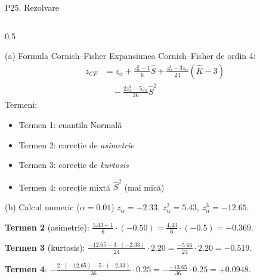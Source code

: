 \documentclass[9pt, aspectratio=169, t]{beamer}
\begin{document}
\begin{frame}[shrink=40]{P25. Rezolvare}
\begin{columns}[T]
\begin{column}{0.5\textwidth}
\begin{block}{(a) Formula Cornish--Fisher}
Expansiunea Cornish--Fisher de ordin 4:
\begin{align*}
z_{CF} &= z_\alpha + \frac{z_\alpha^2 - 1}{6}\hat S + \frac{z_\alpha^3 - 3z_\alpha}{24}(\hat K - 3) \\
&\quad - \frac{2z_\alpha^3 - 5z_\alpha}{36}\hat S^2
\end{align*}
Termeni:
\begin{itemize}\setlength{\itemsep}{0pt}
    \item Termen 1: cuantila Normală
    \item Termen 2: corecție de \emph{asimetrie}
    \item Termen 3: corecție de \emph{kurtosis}
    \item Termen 4: corecție mixtă $\hat S^2$ (mai mică)
\end{itemize}
\end{block}
\begin{block}{(b) Calcul numeric ($\alpha=0.01$)}
$z_\alpha = -2.33$, $z_\alpha^2 = 5.43$, $z_\alpha^3 = -12.65$.

\textbf{Termen 2} (asimetrie): $\frac{5.43-1}{6}\cdot(-0.50) = \frac{4.43}{6}\cdot(-0.5) = -0.369$.

\textbf{Termen 3} (kurtosis): $\frac{-12.65-3\cdot(-2.33)}{24}\cdot 2.20 = \frac{-5.66}{24}\cdot 2.20 = -0.519$.

\textbf{Termen 4}: $-\frac{2\cdot(-12.65)-5\cdot(-2.33)}{36}\cdot 0.25 = -\frac{-13.65}{36}\cdot 0.25 = +0.0948$.


\end{block}
\end{column}
\end{columns}
\end{frame}
\end{document}
